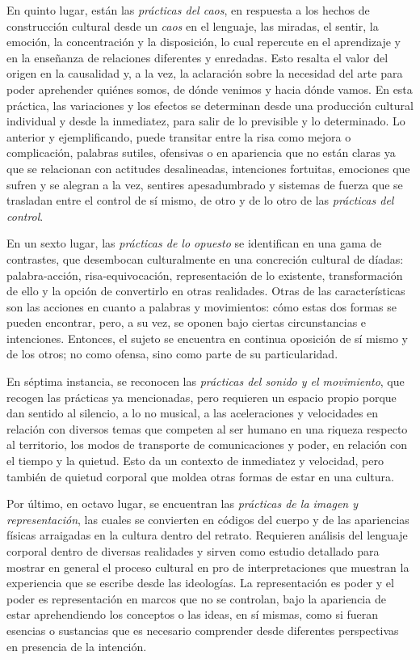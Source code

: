 \documentclass[spanish]{textolivre}
\begin{document}
En quinto lugar, están las \textit{prácticas del caos}, en respuesta a los hechos de construcción cultural desde un \textit{caos} en el lenguaje, las miradas, el sentir, la emoción, la concentración y la disposición, lo cual repercute en el aprendizaje y en la enseñanza de relaciones diferentes y enredadas. Esto resalta el valor del origen en la causalidad y, a la vez, la aclaración sobre la necesidad del arte para poder aprehender quiénes somos, de dónde venimos y hacia dónde vamos. En esta práctica, las variaciones y los efectos se determinan desde una producción cultural individual y desde la inmediatez, para salir de lo previsible y lo determinado. Lo anterior y ejemplificando, puede transitar entre la risa como mejora o complicación, palabras sutiles, ofensivas o en apariencia que no están claras ya que se relacionan con actitudes desalineadas, intenciones fortuitas, emociones que sufren y se alegran a la vez, sentires apesadumbrado y sistemas de fuerza que se trasladan entre el control de sí mismo, de otro y de lo otro de las \textit{prácticas del control}.

En un sexto lugar, las \textit{prácticas de lo opuesto} se identifican en una gama de contrastes, que desembocan culturalmente en una concreción cultural de díadas: palabra-acción, risa-equivocación, representación de lo existente, transformación de ello y la opción de convertirlo en otras realidades. Otras de las características son las acciones en cuanto a palabras y movimientos: cómo estas dos formas se pueden encontrar, pero, a su vez, se oponen bajo ciertas circunstancias e intenciones. Entonces, el sujeto se encuentra en continua oposición de sí mismo y de los otros; no como ofensa, sino como parte de su particularidad.

En séptima instancia, se reconocen las \textit{prácticas del sonido y el movimiento}, que recogen las prácticas ya mencionadas, pero requieren un espacio propio porque dan sentido al silencio, a lo no musical, a las aceleraciones y velocidades en relación con diversos temas que competen al ser humano en una riqueza respecto al territorio, los modos de transporte de comunicaciones y poder, en relación con el tiempo y la quietud. Esto da un contexto de inmediatez y velocidad, pero también de quietud corporal que moldea otras formas de estar en una cultura. 

Por último, en octavo lugar, se encuentran las \textit{prácticas de la imagen y representación}, las cuales se convierten en códigos del cuerpo y de las apariencias físicas arraigadas en la cultura dentro del retrato. Requieren análisis del lenguaje corporal dentro de diversas realidades y sirven como estudio detallado para mostrar en general el proceso cultural en pro de interpretaciones que muestran la experiencia que se escribe desde las ideologías. La representación es poder y el poder es representación en marcos que no se controlan, bajo la apariencia de estar aprehendiendo los conceptos o las ideas, en sí mismas, como si fueran esencias o sustancias que es necesario comprender desde diferentes perspectivas en presencia de la intención.	
\end{document}
